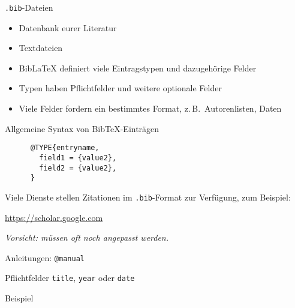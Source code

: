 \begin{frame}[fragile]{\texttt{.bib}-Dateien}
  \begin{itemize}
    \item Datenbank eurer Literatur
    \item Textdateien
    \item Bib\LaTeX{} definiert viele Eintragstypen und dazugehörige Felder
    \item Typen haben Pflichtfelder und weitere optionale Felder
    \item Viele Felder fordern ein bestimmtes Format, z.\,B.\ Autorenlisten, Daten
  \end{itemize}

  \begin{block}{Allgemeine Syntax von BibTeX-Einträgen}
    \begin{lstlisting}
      @TYPE{entryname,
        field1 = {value2},
        field2 = {value2},
      }
    \end{lstlisting}
  \end{block}


  Viele Dienste stellen Zitationen im \texttt{.bib}-Format zur Verfügung, zum Beispiel:
  \begin{center}
    \url{https://scholar.google.com}
  \end{center}

  \emph{Vorsicht: müssen oft noch angepasst werden.}
\end{frame}


\begin{frame}[fragile]{Anleitungen: \lstinline+@manual+}
  \begin{block}{Pflichtfelder}
    \texttt{title}, \hspace{2em}
    \texttt{year} oder \texttt{date}
  \end{block}

  \begin{block}{Beispiel}
    
  \end{block}
\end{frame}

